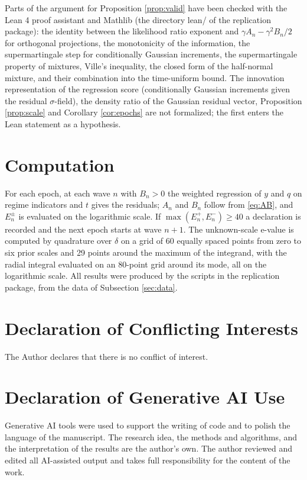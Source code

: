\documentclass[Afour,sageh,times]{sagej}
\theoremstyle{definition}
\begin{document}
Parts of the argument for Proposition \ref{prop:valid} have been checked with the Lean 4 proof assistant and Mathlib (the directory lean/ of the replication package): the identity between the likelihood ratio exponent and $\gamma A_n - \gamma^2 B_n/2$ for orthogonal projections, the monotonicity of the information, the supermartingale step for conditionally Gaussian increments, the supermartingale property of mixtures, Ville's inequality, the closed form of the half-normal mixture, and their combination into the time-uniform bound. The innovation representation of the regression score (conditionally Gaussian increments given the residual $\sigma$-field), the density ratio of the Gaussian residual vector, Proposition \ref{prop:scale} and Corollary \ref{cor:epochs} are not formalized; the first enters the Lean statement as a hypothesis.

\section{Computation}
\label{app:computation}

For each epoch, at each wave $n$ with $B_n > 0$ the weighted regression of $y$ and $q$ on regime indicators and $t$ gives the residuals; $A_n$ and $B_n$ follow from \eqref{eq:AB}, and $E_n^{\pm}$ is evaluated on the logarithmic scale. If $\max(E_n^{+}, E_n^{-}) \ge 40$ a declaration is recorded and the next epoch starts at wave $n+1$. The unknown-scale e-value is computed by quadrature over $\delta$ on a grid of 60 equally spaced points from zero to six prior scales and 29 points around the maximum of the integrand, with the radial integral evaluated on an 80-point grid around its mode, all on the logarithmic scale. All results were produced by the scripts in the replication package, from the data of Subsection \ref{sec:data}.

\section*{Declaration of Conflicting Interests}
The Author declares that there is no conflict of interest.

\section*{Declaration of Generative AI Use}
Generative AI tools were used to support the writing of code and to polish the language of the manuscript. The research idea, the methods and algorithms, and the interpretation of the results are the author's own. The author reviewed and edited all AI-assisted output and takes full responsibility for the content of the work.
\end{document}
